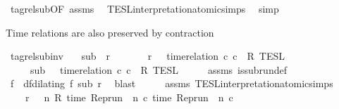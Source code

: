\begin{isabellebody}
%
\isadelimproof
%
\endisadelimproof
%
\isatagproof
{}\isamarkupfalse%
\ tagrel{\isacharunderscore}sub{\isacharprime}{\isacharbrackleft}OF\ assms{\isacharbrackright}\ \isamarkupfalse%
\ TESL{\isacharunderscore}interpretation{\isacharunderscore}atomic{\isachardot}simps{\isacharparenleft}{}{\isacharparenright}\ \isamarkupfalse%
\ simp%
\endisatagproof
{\isafoldproof}%
%
\isadelimproof
%
\endisadelimproof
%
\begin{isamarkuptext}%
Time relations are also preserved by contraction%
\end{isamarkuptext}\isamarkuptrue%
\isamarkupfalse%
\ tagrel{\isacharunderscore}sub{\isacharunderscore}inv{\isacharcolon}\isanewline
\ \ \ {\isacartoucheopen}sub\ {\isasymlless}\ r{\isacartoucheclose}\isanewline
\ \ \ \ \ \ \ {\isacartoucheopen}r\ {\isasymin}\ {\isasymlbrakk}\ time{\isacharminus}relation\ {\isasymlfloor}c\ c\ {\isasymin}\ R\ {\isasymrbrakk}\isactrlsub T\isactrlsub E\isactrlsub S\isactrlsub L{\isacartoucheclose}\isanewline
\ \ \ \ \ {\isacartoucheopen}sub\ {\isasymin}\ {\isasymlbrakk}\ time{\isacharminus}relation\ {\isasymlfloor}c\ c\ {\isasymin}\ R\ {\isasymrbrakk}\isactrlsub T\isactrlsub E\isactrlsub S\isactrlsub L{\isacartoucheclose}\isanewline
%
\isadelimproof
%
\endisadelimproof
%
\isatagproof
{}\isamarkupfalse%
\ {\isacharminus}\isanewline
\ \ \isamarkupfalse%
\ assms{\isacharparenleft}{}{\isacharparenright}\ is{\isacharunderscore}subrun{\isacharunderscore}def\ \isamarkupfalse%
\ f\ \ df{\isacharcolon}{\isacartoucheopen}dilating\ f\ sub\ r{\isacartoucheclose}\ \isamarkupfalse%
\ blast\isanewline
\ \ \isamarkupfalse%
\ \isamarkupfalse%
\ assms{\isacharparenleft}{}{\isacharparenright}\ TESL{\isacharunderscore}interpretation{\isacharunderscore}atomic{\isachardot}simps{\isacharparenleft}{}{\isacharparenright}\ \isamarkupfalse%
\isanewline
\ \ \ \ {\isacartoucheopen}r\ {\isasymin}\ {\isacharbraceleft}{\isasymrho}{\isachardot}\ {\isasymforall}n{\isachardot}\ R\ {\isacharparenleft}time\ {\isacharparenleft}{\isacharparenleft}Rep{\isacharunderscore}run\ {\isasymrho}{\isacharparenright}\ n\ c\ time\ {\isacharparenleft}{\isacharparenleft}Rep{\isacharunderscore}run\ {\isasymrho}{\isacharparenright}\ n\ c\ \isamarkupfalse%

\end{isabellebody}
